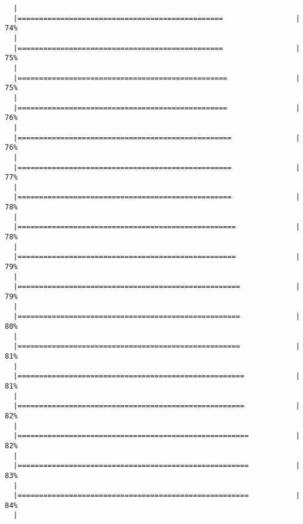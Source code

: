 \documentclass[]{article}
\begin{document}
\begin{verbatim}
  |                                                                       
  |================================================                 |  74%
  |                                                                       
  |================================================                 |  75%
  |                                                                       
  |=================================================                |  75%
  |                                                                       
  |=================================================                |  76%
  |                                                                       
  |==================================================               |  76%
  |                                                                       
  |==================================================               |  77%
  |                                                                       
  |==================================================               |  78%
  |                                                                       
  |===================================================              |  78%
  |                                                                       
  |===================================================              |  79%
  |                                                                       
  |====================================================             |  79%
  |                                                                       
  |====================================================             |  80%
  |                                                                       
  |====================================================             |  81%
  |                                                                       
  |=====================================================            |  81%
  |                                                                       
  |=====================================================            |  82%
  |                                                                       
  |======================================================           |  82%
  |                                                                       
  |======================================================           |  83%
  |                                                                       
  |======================================================           |  84%
  |                                                                       

\end{verbatim}
\end{document}
